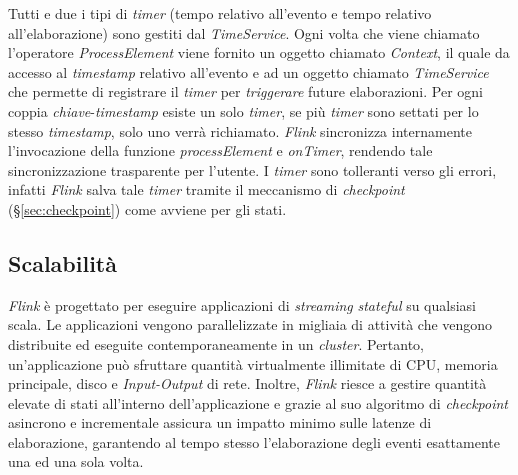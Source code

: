 \label{sec:timer}
\noindent Tutti e due i tipi di \textit{timer} (tempo relativo all'evento e tempo relativo all'elaborazione) sono gestiti dal \textit{TimeService}. Ogni volta che viene chiamato l'operatore \textit{ProcessElement} viene fornito un oggetto chiamato \textit{Context}, il quale da accesso al \textit{\gls{timestamp}} relativo all'evento e ad un oggetto chiamato \textit{TimeService} che permette di registrare il \textit{timer} per \textit{triggerare} future elaborazioni. Per ogni coppia \textit{chiave}-\textit{\gls{timestamp}} esiste un solo \textit{timer}, se più \textit{timer} sono settati per lo stesso \textit{\gls{timestamp}}, solo uno verrà richiamato. \textit{Flink} sincronizza internamente l'invocazione della funzione \textit{processElement} e \textit{onTimer}, rendendo tale sincronizzazione trasparente per l'utente. I \textit{timer} sono tolleranti verso gli errori, infatti \textit{Flink} salva tale \textit{timer} tramite il meccanismo di \textit{checkpoint} (\S\ref{sec:checkpoint}) come avviene per gli stati.


\subsection{Scalabilità}
\textit{Flink} è progettato per eseguire applicazioni di \textit{streaming} \textit{\gls{stateful}} su qualsiasi scala. Le applicazioni vengono parallelizzate in migliaia di attività che vengono distribuite ed eseguite contemporaneamente in un \textit{\gls{cluster}}. Pertanto, un'applicazione può sfruttare quantità virtualmente illimitate di CPU, memoria principale, disco e \textit{Input-Output} di rete. Inoltre, \textit{Flink} riesce a gestire quantità elevate di stati all'interno dell'applicazione e grazie al suo algoritmo di \textit{checkpoint} asincrono e incrementale assicura un impatto minimo sulle latenze di elaborazione, garantendo al tempo stesso l'elaborazione degli eventi esattamente una ed una sola volta.

